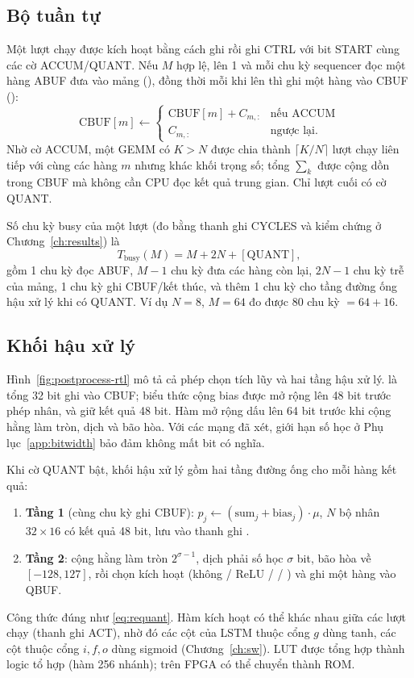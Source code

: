 \subsection{Bộ tuần tự}
Một lượt chạy được kích hoạt bằng cách ghi  rồi ghi CTRL với bit START cùng các cờ ACCUM/QUANT. Nếu $M$ hợp lệ,  lên 1 và mỗi chu kỳ sequencer đọc một hàng ABUF đưa vào mảng (), đồng thời mỗi khi  lên thì ghi một hàng vào CBUF ():
\begin{equation}
  \text{CBUF}[m] \leftarrow \begin{cases} \text{CBUF}[m] + C_{m,:} & \text{nếu ACCUM}\\ C_{m,:} & \text{ngược lại.}\end{cases}
\end{equation}
Nhờ cờ ACCUM, một GEMM có $K>N$ được chia thành $\lceil K/N\rceil$ lượt chạy liên tiếp với cùng các hàng $m$ nhưng khác khối trọng số; tổng $\sum_k$ được cộng dồn trong CBUF mà không cần CPU đọc kết quả trung gian. Chỉ lượt cuối có cờ QUANT.

Số chu kỳ busy của một lượt (đo bằng thanh ghi CYCLES và kiểm chứng ở Chương~\ref{ch:results}) là
\begin{equation}
  T_\text{busy}(M) = M + 2N + [\text{QUANT}],
  \label{eq:tbusy}
\end{equation}
gồm 1 chu kỳ đọc ABUF, $M-1$ chu kỳ đưa các hàng còn lại, $2N-1$ chu kỳ trễ của mảng, 1 chu kỳ ghi CBUF/kết thúc, và thêm 1 chu kỳ cho tầng đường ống hậu xử lý khi có QUANT. Ví dụ  $N=8$, $M=64$ đo được 80 chu kỳ $=64+16$.

\subsection{Khối hậu xử lý}
Hình~\ref{fig:postprocess-rtl} mô tả cả phép chọn tích lũy và hai tầng hậu xử lý.  là tổng 32 bit ghi vào CBUF; biểu thức cộng bias được mở rộng lên 48 bit trước phép nhân, và  giữ kết quả 48 bit. Hàm  mở rộng dấu lên 64 bit trước khi cộng hằng làm tròn, dịch và bão hòa. Với các mạng đã xét, giới hạn số học ở Phụ lục~\ref{app:bitwidth} bảo đảm không mất bit có nghĩa.

Khi cờ QUANT bật, khối hậu xử lý gồm hai tầng đường ống cho mỗi hàng kết quả:
\begin{enumerate}
  \item \textbf{Tầng 1} (cùng chu kỳ ghi CBUF): $p_j \leftarrow (\text{sum}_j + \text{bias}_j)\cdot\mu$, $N$ bộ nhân $32\times16$ có kết quả 48 bit, lưu vào thanh ghi .
  \item \textbf{Tầng 2}: cộng hằng làm tròn $2^{\sigma-1}$, dịch phải số học $\sigma$ bit, bão hòa về $[-128,127]$, rồi chọn kích hoạt (không / ReLU /  / ) và ghi một hàng vào QBUF.
\end{enumerate}
Công thức đúng như \eqref{eq:requant}. Hàm kích hoạt có thể khác nhau giữa các lượt chạy (thanh ghi ACT), nhờ đó các cột của LSTM thuộc cổng $g$ dùng tanh, các cột thuộc cổng $i,f,o$ dùng sigmoid (Chương~\ref{ch:sw}). LUT được tổng hợp thành logic tổ hợp (hàm  256 nhánh); trên FPGA có thể chuyển thành ROM.

